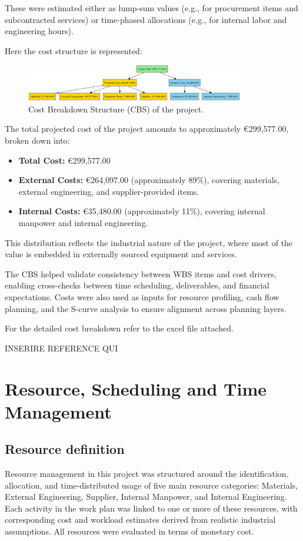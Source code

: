 \documentclass[12pt]{article}
\begin{document}
These were estimated either as lump-sum values (e.g., for procurement items and subcontracted services) or time-phased allocations (e.g., for internal labor and engineering hours).

Here the cost structure is represented:

\begin{figure}[H]
        \centering
        \includegraphics[width=0.85\textwidth]{../cost_breakdown_structure.png}
        \caption{Cost Breakdown Structure (CBS) of the project.}
        \label{fig:cbs}
\end{figure}

The total projected cost of the project amounts to approximately €299,577.00, broken down into:
\begin{itemize}
        \item \textbf{Total Cost:} €299,577.00
        \item \textbf{External Costs:} €264,097.00 (approximately 89\%), covering materials, external engineering, and supplier-provided items.
        \item \textbf{Internal Costs:} €35,480.00 (approximately 11\%), covering internal manpower and internal engineering.
\end{itemize}

This distribution reflects the industrial nature of the project, where most of the value is embedded in externally sourced equipment and services.

The CBS helped validate consistency between WBS items and cost drivers, enabling cross-checks between time scheduling, deliverables, and financial expectations. Costs were also used as inputs for resource profiling, cash flow planning, and the S-curve analysis to ensure alignment across planning layers.

For the detailed cost breakdown refer to the excel file attached.

INSERIRE REFERENCE QUI

\section{Resource, Scheduling and Time Management}
\subsection{Resource definition}
Resource management in this project was structured around the identification, allocation, and time-distributed usage of five main resource categories: Materials, External Engineering, Supplier, Internal Manpower, and Internal Engineering. Each activity in the work plan was linked to one or more of these resources, with corresponding cost and workload estimates derived from realistic industrial assumptions. All resources were evaluated in terms of monetary cost.
\end{document}
